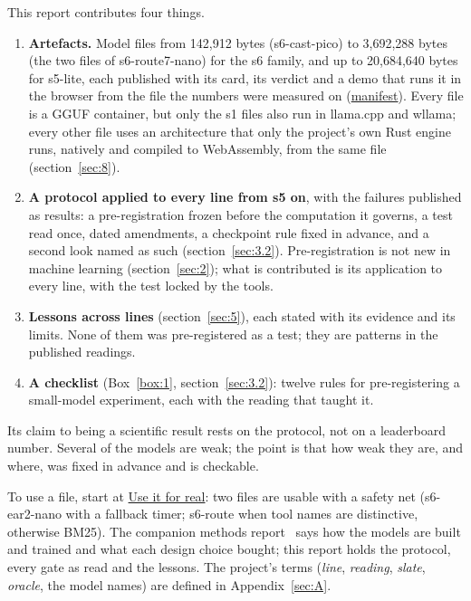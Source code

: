 \documentclass[10pt]{article}
\begin{document}
This report contributes four things.

\begin{enumerate}
\item \textbf{Artefacts.} Model files from 142,912 bytes (s6-cast-pico) to 3,692,288 bytes (the two files of s6-route7-nano) for the s6 family, and up to 20,684,640 bytes for s5-lite, each published with its card, its verdict and a demo that runs it in the browser from the file the numbers were measured on (\href{https://maxgfr.github.io/skycmd/models/manifest.json}{manifest}). Every file is a GGUF container, but only the s1 files also run in llama.cpp and wllama; every other file uses an architecture that only the project's own Rust engine runs, natively and compiled to WebAssembly, from the same file (section~\ref{sec:8}).
\item \textbf{A protocol applied to every line from s5 on}, with the failures published as results: a pre-registration frozen before the computation it governs, a test read once, dated amendments, a checkpoint rule fixed in advance, and a second look named as such (section~\ref{sec:3.2}). Pre-registration is not new in machine learning (section~\ref{sec:2}); what is contributed is its application to every line, with the test locked by the tools.
\item \textbf{Lessons across lines} (section~\ref{sec:5}), each stated with its evidence and its limits. None of them was pre-registered as a test; they are patterns in the published readings.
\item \textbf{A checklist} (Box~\ref{box:1}, section~\ref{sec:3.2}): twelve rules for pre-registering a small-model experiment, each with the reading that taught it.
\end{enumerate}

Its claim to being a scientific result rests on the protocol, not on a leaderboard number. Several of the models are weak; the point is that how weak they are, and where, was fixed in advance and is checkable.

To use a file, start at \href{https://maxgfr.github.io/skycmd/use/}{Use it for real}: two files are usable with a safety net (s6-ear2-nano with a fallback timer; s6-route when tool names are distinctive, otherwise BM25). The companion methods report~\cite{golfier2026methods} says how the models are built and trained and what each design choice bought; this report holds the protocol, every gate as read and the lessons. The project's terms (\emph{line}, \emph{reading}, \emph{slate}, \emph{oracle}, the model names) are defined in Appendix~\ref{sec:A}.
\end{document}
